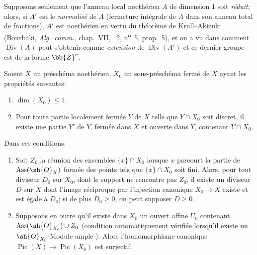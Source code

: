\begin{env}[21.9.10]
\label{IV.21.9.10}
Supposons seulement que l'anneau local noethérien $A$ de dimension $1$ soit \emph{réduit};
alors, si $A'$ est le \emph{normalisé} de $A$ (fermeture intégrale de $A$ dans son anneau total de fractions), $A'$ est noethérien en vertu du théorème de Krull--Akizuki (Bourbaki, \emph{Alg.\ comm.}, chap.~VII, \textsection~2, n\textsuperscript{o}~5, prop.~5), et on a vu dans  comment
$\operatorname{Div}(A)$ peut s'obtenir comme \emph{extension} de $\operatorname{Div}(A')$ et ce dernier groupe est de la forme $\bb{Z}^r$.
\end{env}

\begin{proposition}[21.9.11]
\label{IV.21.9.11}
Soient $X$ un préschéma noethérien, $X_0$ un sous-préschéma fermé de $X$ ayant les propriétés suivantes:
\begin{enumerate}
  \item[\rm 1\textsuperscript{o}] $\dim(X_0)\leq1$.
  \item[\rm 2\textsuperscript{o}] Pour toute partie localement fermée $Y$ de $X$ telle que $Y\cap X_0$ soit discret, il existe une partie $Y'$ de $Y$, fermée dans $X$ et ouverte dans $Y$, contenant $Y\cap X_0$.
\end{enumerate}
Dans ces conditions:
\begin{enumerate}[label=(\roman*)]
  \item Soit $Z_0$ la réunion des ensembles $\overline{\{x\}}\cap X_0$ lorsque $x$ parcourt la partie de $\operatorname{Ass}(\sh{O}_X)$ formée des points tels que $\overline{\{x\}}\cap X_0$ soit fini.
Alors, pour tout diviseur $D_0$ sur $X_0$, dont le support ne rencontre pas $Z_0$, il existe un diviseur $D$ sur $X$ dont l'image réciproque par l'injection canonique $X_0\to X$ existe  et est égale à $D_0$;
si de plus $D_0\geq0$, on peut supposer $D\geq0$.

  \item Supposons en outre qu'il existe dans $X_0$ un ouvert affine $U_0$ contenant $\operatorname{Ass}(\sh{O}_{X_0})\cup Z_0$ (condition automatiquement vérifiée lorsqu'il existe un $\sh{O}_{X_0}$-Module ample ).
Alors l'homomorphisme canonique  $\operatorname{Pic}(X)\to\operatorname{Pic}(X_0)$ est surjectif.
\end{enumerate}
\end{proposition}

